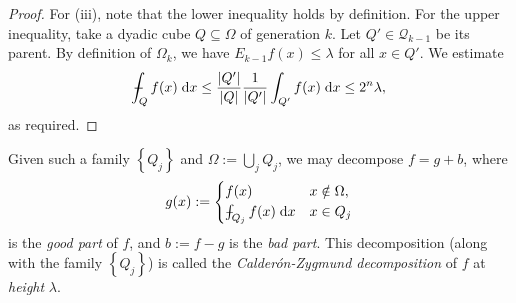 \documentclass{book}
\newcommand{\scrQ}{\mathscr{Q}}
\renewcommand{\d}{\mathrm{d}}
\newcommand{\abs}[1]{\left\lvert {#1} \right\rvert}
\newcommand{\set}[1]{\left\{ {#1} \right\}}
\def\Xint#1{\mathchoice
{\XXint\displaystyle\textstyle{#1}}%
{\XXint\textstyle\scriptstyle{#1}}%
{\XXint\scriptstyle\scriptscriptstyle{#1}}%
{\XXint\scriptscriptstyle\scriptscriptstyle{#1}}%
\!\int}
\def\XXint#1#2#3{{\setbox0=\hbox{$#1{#2#3}{\int}$ }
\vcenter{\hbox{$#2#3$ }}\kern-.6\wd0}}
\def\dashint{\Xint-}
\theoremstyle{definition}
\theoremstyle{remark}
\numberwithin{equation}{chapter}
\begin{document}
\begin{proof}
    For (iii), note that the lower inequality holds by definition. For the upper inequality, take a dyadic cube $Q \subseteq \Omega$ of generation $k$. Let $Q' \in \scrQ_{k-1}$ be its parent. By definition of $\Omega_k$, we have $E_{k-1}f(x) \leq \lambda$ for all $x \in Q'$. We estimate
    \begin{equation} \begin{aligned}
        \dashint_Q f(x) \; \d x \leq \frac{\abs{Q'}}{\abs{Q}} \frac{1}{\abs{Q'}} \int_{Q'} f(x) \; \d x \leq 2^n \lambda,
    \end{aligned} \end{equation}
    as required.
\end{proof}
Given such a family $\set{Q_j}$ and $\Omega := \bigcup_{j} Q_j$, we may decompose $f = g + b$, where
\begin{equation}
    g(x) := \begin{cases}
        f(x) & x \notin \Omega, \\
        \dashint_{Q_j} f(x) \; \d x & x \in Q_j
    \end{cases}
\end{equation}
is the \textit{good part} of $f$, and $b := f - g$ is the \textit{bad part}. This decomposition (along with the family $\set{Q_j}$) is called the \textit{Calder\'on-Zygmund decomposition} of $f$ at \textit{height} $\lambda$.
\end{document}
